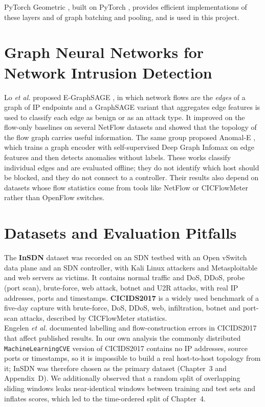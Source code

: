 PyTorch Geometric \cite{bib:pyg}, built on PyTorch \cite{bib:pytorch}, provides efficient implementations of these layers and of graph batching and pooling, and is used in this project.

\section{Graph Neural Networks for Network Intrusion Detection}

Lo \emph{et al.} proposed E-GraphSAGE \cite{bib:egraphsage}, in which network flows are the \emph{edges} of a graph of IP endpoints and a GraphSAGE variant that aggregates edge features is used to classify each edge as benign or as an attack type. It improved on the flow-only baselines on several NetFlow datasets and showed that the topology of the flow graph carries useful information. The same group proposed Anomal-E \cite{bib:anomale}, which trains a graph encoder with self-supervised Deep Graph Infomax on edge features and then detects anomalies without labels. These works classify individual edges and are evaluated offline; they do not identify which host should be blocked, and they do not connect to a controller. Their results also depend on datasets whose flow statistics come from tools like NetFlow or CICFlowMeter rather than OpenFlow switches.

\section{Datasets and Evaluation Pitfalls}

The \textbf{InSDN} dataset \cite{bib:insdn} was recorded on an SDN testbed with an Open vSwitch data plane and an SDN controller, with Kali Linux attackers and Metasploitable and web servers as victims. It contains normal traffic and DoS, DDoS, probe (port scan), brute-force, web attack, botnet and U2R attacks, with real IP addresses, ports and timestamps. \textbf{CICIDS2017} \cite{bib:cicids} is a widely used benchmark of a five-day capture with brute-force, DoS, DDoS, web, infiltration, botnet and port-scan attacks, described by CICFlowMeter statistics.\\

Engelen \emph{et al.} \cite{bib:engelen} documented labelling and flow-construction errors in CICIDS2017 that affect published results. In our own analysis the commonly distributed \texttt{MachineLearningCVE} version of CICIDS2017 contains no IP addresses, source ports or timestamps, so it is impossible to build a real host-to-host topology from it; InSDN was therefore chosen as the primary dataset (Chapter~3 and Appendix~D). We additionally observed that a random split of overlapping sliding windows leaks near-identical windows between training and test sets and inflates scores, which led to the time-ordered split of Chapter~4.


